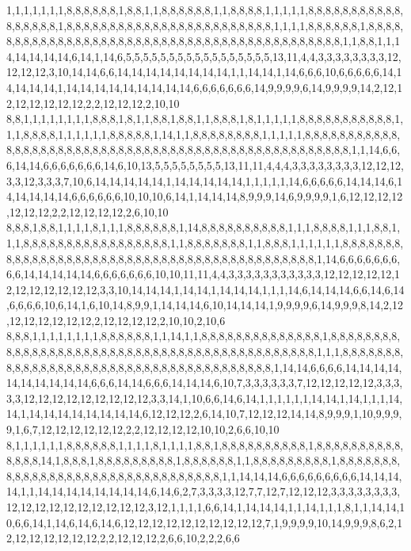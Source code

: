 1,1,1,1,1,1,1,8,8,8,8,8,8,1,8,8,1,1,8,8,8,8,8,8,1,1,8,8,8,8,1,1,1,1,1,8,8,8,8,8,8,8,8,8,8,8,8,8,8,8,8,8,1,8,8,8,8,8,8,8,8,8,8,8,8,8,8,8,8,8,8,8,8,8,8,8,8,1,1,1,1,8,8,8,8,8,8,1,8,8,8,8,8,8,8,8,8,8,8,8,8,8,8,8,8,8,8,8,8,8,8,8,8,8,8,8,8,8,8,8,8,8,8,8,8,8,8,8,8,8,8,1,1,8,8,1,1,14,14,14,14,14,6,14,1,14,6,5,5,5,5,5,5,5,5,5,5,5,5,5,5,5,5,5,13,11,4,4,3,3,3,3,3,3,3,3,12,12,12,12,3,10,14,14,6,6,14,14,14,14,14,14,14,14,1,1,14,14,1,14,6,6,6,10,6,6,6,6,6,14,14,14,14,14,1,14,14,14,14,14,14,14,14,14,6,6,6,6,6,6,6,14,9,9,9,9,6,14,9,9,9,9,14,2,12,12,12,12,12,12,12,2,2,12,12,12,2,10,10
8,8,1,1,1,1,1,1,1,1,8,8,8,1,8,1,1,8,8,1,8,8,1,1,8,8,8,1,8,1,1,1,1,1,8,8,8,8,8,8,8,8,8,8,8,1,1,1,8,8,8,8,1,1,1,1,1,1,8,8,8,8,8,1,14,1,1,8,8,8,8,8,8,8,8,1,1,1,1,1,8,8,8,8,8,8,8,8,8,8,8,8,8,8,8,8,8,8,8,8,8,8,8,8,8,8,8,8,8,8,8,8,8,8,8,8,8,8,8,8,8,8,8,8,8,8,8,8,8,8,8,1,1,14,6,6,6,14,14,6,6,6,6,6,6,6,14,6,10,13,5,5,5,5,5,5,5,5,13,11,11,4,4,4,3,3,3,3,3,3,3,3,12,12,12,3,3,12,3,3,3,7,10,6,14,14,14,14,14,1,14,14,14,14,14,1,1,1,1,1,14,6,6,6,6,6,14,14,14,6,14,14,14,14,14,6,6,6,6,6,6,10,10,10,6,14,1,14,14,14,8,9,9,9,14,6,9,9,9,9,1,6,12,12,12,12,12,12,12,2,2,12,12,12,12,2,6,10,10
8,8,8,1,8,8,1,1,1,1,8,1,1,1,8,8,8,8,8,8,1,14,8,8,8,8,8,8,8,8,8,8,1,1,1,8,8,8,8,1,1,1,8,8,1,1,1,8,8,8,8,8,8,8,8,8,8,8,8,8,8,8,8,8,1,1,8,8,8,8,8,8,8,1,1,8,8,8,1,1,1,1,1,1,8,8,8,8,8,8,8,8,8,8,8,8,8,8,8,8,8,8,8,8,8,8,8,8,8,8,8,8,8,8,8,8,8,8,8,8,8,8,8,8,8,8,8,1,14,6,6,6,6,6,6,6,6,6,14,14,14,14,14,6,6,6,6,6,6,6,10,10,11,11,4,4,3,3,3,3,3,3,3,3,3,3,3,12,12,12,12,12,12,12,12,12,12,12,12,3,3,10,14,14,14,1,14,14,1,14,14,14,1,1,1,14,6,14,14,14,6,6,14,6,14,6,6,6,6,10,6,14,1,6,10,14,8,9,9,1,14,14,14,6,10,14,14,14,1,9,9,9,9,6,14,9,9,9,8,14,2,12,12,12,12,12,12,12,2,12,12,12,12,2,10,10,2,10,6
8,8,8,1,1,1,1,1,1,1,1,8,8,8,8,8,8,1,1,14,1,1,8,8,8,8,8,8,8,8,8,8,8,8,8,8,1,8,8,8,8,8,8,8,8,8,8,8,8,8,8,8,8,8,8,8,8,8,8,8,8,8,8,8,8,8,8,8,8,8,8,8,8,8,8,8,8,8,8,8,8,1,1,1,8,8,8,8,8,8,8,8,8,8,8,8,8,8,8,8,8,8,8,8,8,8,8,8,8,8,8,8,8,8,8,8,8,8,8,8,8,8,1,14,14,6,6,6,6,14,14,14,14,14,14,14,14,14,14,6,6,6,14,14,6,6,6,14,14,14,6,10,7,3,3,3,3,3,3,7,12,12,12,12,12,3,3,3,3,3,12,12,12,12,12,12,12,12,12,3,3,14,1,10,6,6,14,6,14,1,1,1,1,1,1,14,14,1,14,1,1,1,14,14,1,14,14,14,14,14,14,14,14,6,12,12,12,2,6,14,10,7,12,12,12,14,14,8,9,9,9,1,10,9,9,9,9,1,6,7,12,12,12,12,12,12,2,2,12,12,12,12,10,10,2,6,6,10,10
8,1,1,1,1,1,1,8,8,8,8,8,8,1,1,1,1,8,1,1,1,1,8,8,1,8,8,8,8,8,8,8,8,8,8,1,8,8,8,8,8,8,8,8,8,8,8,8,8,8,14,1,8,8,8,1,8,8,8,8,8,8,8,8,8,1,8,8,8,8,8,8,1,1,8,8,8,8,8,8,8,8,8,1,8,8,8,8,8,8,8,8,8,8,8,8,8,8,8,8,8,8,8,8,8,8,8,8,8,8,8,8,8,8,8,8,1,1,14,14,14,6,6,6,6,6,6,6,6,6,14,14,14,14,1,1,14,14,14,14,14,14,14,14,6,14,6,2,7,3,3,3,3,12,7,7,12,7,12,12,12,3,3,3,3,3,3,3,3,12,12,12,12,12,12,12,12,12,12,3,12,1,1,1,1,6,6,14,1,14,14,14,1,1,14,1,1,1,8,1,1,14,14,10,6,6,14,1,14,6,14,6,14,6,12,12,12,12,12,12,12,12,12,12,7,1,9,9,9,9,10,14,9,9,9,8,6,2,12,12,12,12,12,12,12,2,2,12,12,12,2,6,6,10,2,2,2,6,6

